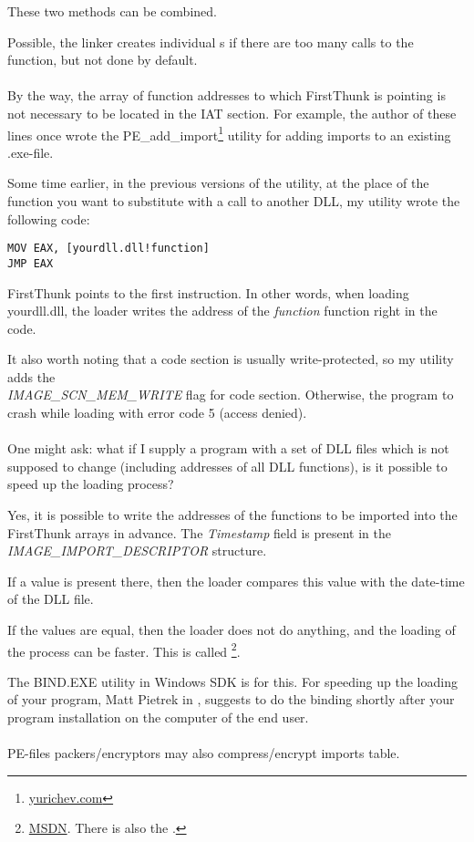 These two methods can be combined.

Possible, the linker creates individual s if there are too many calls to the function,
but not done by default. \\
\\
By the way, the array of function addresses to which FirstThunk is pointing is not necessary to be located in the \ac{IAT} section.
For example, the author of these lines once wrote the PE\_add\_import\footnote{\href{http://go.yurichev.com/17049}{yurichev.com}}
utility for adding imports to an existing .exe-file.

Some time earlier, in the previous versions of the utility,
at the place of the function you want to substitute with a call to another DLL,
my utility wrote the following code:

\begin{lstlisting}[style=customasmx86]
MOV EAX, [yourdll.dll!function]
JMP EAX
\end{lstlisting}

FirstThunk points to the first instruction. In other words, when loading yourdll.dll,
the loader writes the address of the \emph{function} function right in the code.

It also worth noting that a code section is usually write-protected, so my utility adds the \\
\emph{IMAGE\_SCN\_MEM\_WRITE}
flag for code section. Otherwise, the program to crash while loading with error code
5 (access denied). \\
\\
One might ask: what if I supply a program with a set of DLL files which is not supposed to change (including addresses of all DLL functions),
is it possible to speed up the loading process?

Yes, it is possible to write the addresses of the functions to be imported into the FirstThunk arrays in advance.
The \emph{Timestamp} field is present in the \\
\emph{IMAGE\_IMPORT\_DESCRIPTOR} structure.

If a value is present there, then the loader compares this value with the date-time of the DLL file.

If the values are equal, then the loader does not do anything, and the loading of the process can be faster.
This is called 
\footnote{\href{http://go.yurichev.com/17050}{MSDN}. There is also the .}.

The BIND.EXE utility in Windows SDK is for this.
For speeding up the loading of your program, Matt Pietrek in \PietrekPEURL, suggests to do the binding shortly after your program
installation on the computer of the end user. \\
\\
PE-files packers/encryptors may also compress/encrypt imports table.

